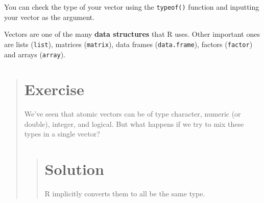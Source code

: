 \documentclass[]{book}
\begin{document}
You can check the type of your vector using the \texttt{typeof()}
function and inputting your vector as the argument.

Vectors are one of the many \textbf{data structures} that R uses. Other
important ones are lists (\texttt{list}), matrices (\texttt{matrix}),
data frames (\texttt{data.frame}), factors (\texttt{factor}) and arrays
(\texttt{array}).

\begin{quote}
\section{Exercise}\label{exercise-4}

We've seen that atomic vectors can be of type character, numeric (or
double), integer, and logical. But what happens if we try to mix these
types in a single vector?

\begin{quote}
\section{Solution}\label{solution-1}

R implicitly converts them to all be the same type.
\end{quote}
\end{quote}
\end{document}
